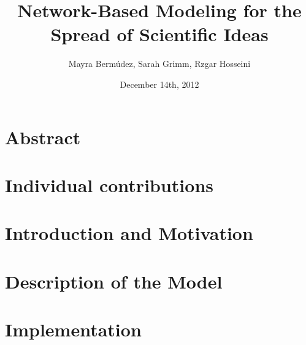 \documentclass[11pt]{article}
\title{Network-Based Modeling for the Spread of Scientific Ideas}
\author{Mayra Berm\'udez, Sarah Grimm, Rzgar Hosseini}
\date{December 14th, 2012}
\begin{document}

\newpage



\newpage








\tableofcontents

\newpage




\section{Abstract}

\newpage

\section{Individual contributions}

\newpage

\section{Introduction and Motivation}

\newpage

\section{Description of the Model}

\newpage

\section{Implementation}

\newpage
\end{document}
